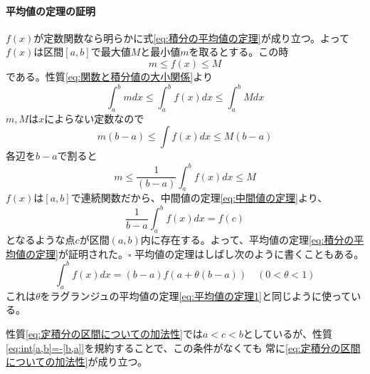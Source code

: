 \documentclass[a4j,dvipdfmx]{jsarticle}
\begin{document}
                \paragraph{平均値の定理の証明}
                    $f(x)$が定数関数なら明らかに式\eqref{eq:積分の平均値の定理}が成り立つ。よって$f(x)$は区間$[a,b]$で最大値$M$と最小値$m$を取るとする。この時
                    \begin{equation*}
                        m\leq f(x) \leq M
                    \end{equation*}
                    である。性質\eqref{eq:関数と積分値の大小関係}より
                    \begin{equation*}
                        \int_a^b mdx \leq \int_a^b f(x)dx \leq \int_a^b Mdx
                    \end{equation*}
                    $m,M$は$x$によらない定数なので
                    \begin{equation*}
                        m(b-a) \leq \int f(x)dx \leq M(b-a)
                    \end{equation*}
                    各辺を$b-a$で割ると
                    \begin{equation*}
                        m \leq \frac{1}{(b-a)}\int_a^b f(x)dx \leq M
                    \end{equation*}
                    $f(x)$は$[a,b]$で連続関数だから、中間値の定理\eqref{eq:中間値の定理}より、
                    \begin{equation*}
                        \frac{1}{b-a}\int_a^b f(x)dx = f(c)
                    \end{equation*}
                    となるような点$c$が区間$(a,b)$内に存在する。よって、平均値の定理\eqref{eq:積分の平均値の定理}が証明された。$\square$
                平均値の定理はしばし次のように書くこともある。
                \begin{equation}
                    \int_{a}^{b}f(x)dx = (b-a)f(a+\theta(b-a))\quad (0<\theta < 1) \label{eq:積分の平均値の定理θ}
                \end{equation}
                これは$\theta$をラグランジュの平均値の定理\eqref{eq:平均値の定理1}と同じように使っている。

                性質\eqref{eq:定積分の区間についての加法性}では$a<c<b$としているが、性質\eqref{eq:int[a,b]=-[b,a]}を規約することで、この条件がなくても
                常に\eqref{eq:定積分の区間についての加法性}が成り立つ。

                \hrulefill
\end{document}
